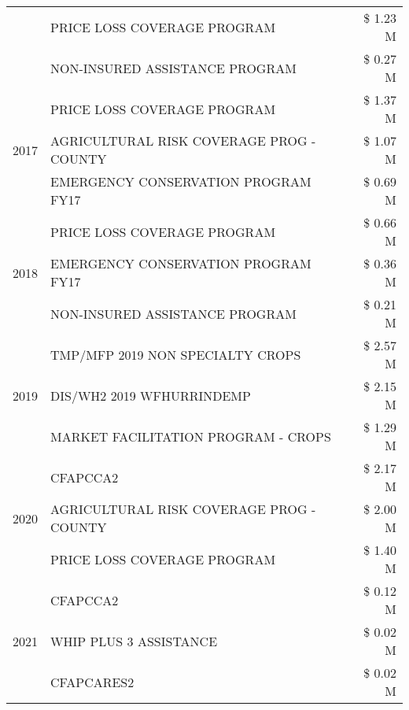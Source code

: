 \begin{tabular}{llr}
 & PRICE LOSS COVERAGE PROGRAM & \$ 1.23 M \\
 & NON-INSURED ASSISTANCE PROGRAM & \$ 0.27 M \\
\cline{1-3}
\multirow[t]{3}{*}{2017} & PRICE LOSS COVERAGE PROGRAM & \$ 1.37 M \\
 & AGRICULTURAL RISK COVERAGE PROG - COUNTY & \$ 1.07 M \\
 & EMERGENCY CONSERVATION PROGRAM FY17 & \$ 0.69 M \\
\cline{1-3}
\multirow[t]{3}{*}{2018} & PRICE LOSS COVERAGE PROGRAM & \$ 0.66 M \\
 & EMERGENCY CONSERVATION PROGRAM FY17 & \$ 0.36 M \\
 & NON-INSURED ASSISTANCE PROGRAM & \$ 0.21 M \\
\cline{1-3}
\multirow[t]{3}{*}{2019} & TMP/MFP 2019 NON SPECIALTY CROPS & \$ 2.57 M \\
 & DIS/WH2 2019 WFHURRINDEMP & \$ 2.15 M \\
 & MARKET FACILITATION PROGRAM - CROPS & \$ 1.29 M \\
\cline{1-3}
\multirow[t]{3}{*}{2020} & CFAPCCA2 & \$ 2.17 M \\
 & AGRICULTURAL RISK COVERAGE PROG - COUNTY & \$ 2.00 M \\
 & PRICE LOSS COVERAGE PROGRAM & \$ 1.40 M \\
\cline{1-3}
\multirow[t]{3}{*}{2021} & CFAPCCA2 & \$ 0.12 M \\
 & WHIP PLUS 3 ASSISTANCE & \$ 0.02 M \\
 & CFAPCARES2 & \$ 0.02 M \\
\cline{1-3}
\bottomrule
\end{tabular}
